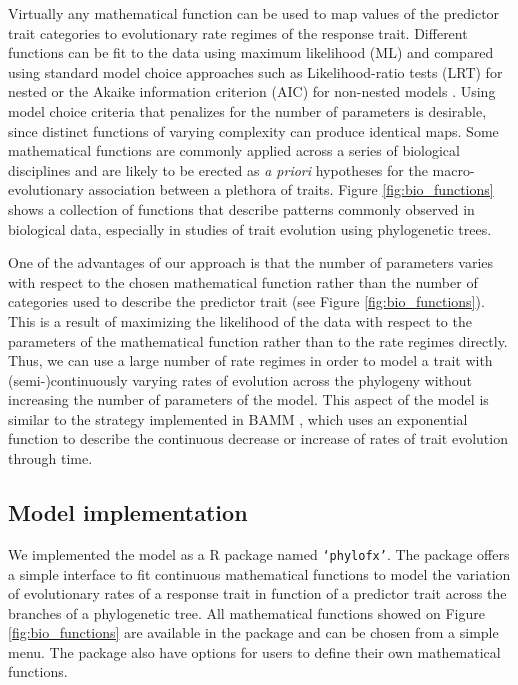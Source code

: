Virtually any mathematical function can be used to map values of the predictor trait categories to evolutionary rate regimes of the response trait. Different functions can be fit to the data using maximum likelihood (ML) and compared using standard model choice approaches such as Likelihood-ratio tests (LRT) for nested or the Akaike information criterion (AIC) for non-nested models \citep{burnham_model_2003}. Using model choice criteria that penalizes for the number of parameters \citep[such as AIC --][]{burnham_model_2003} is desirable, since distinct functions of varying complexity can produce identical maps. Some mathematical functions are commonly applied across a series of biological disciplines and are likely to be erected as \textit{a priori} hypotheses for the macro-evolutionary association between a plethora of traits. Figure \ref{fig:bio_functions} shows a collection of functions that describe patterns commonly observed in biological data, especially in studies of trait evolution using phylogenetic trees.

One of the advantages of our approach is that the number of parameters varies with respect to the chosen mathematical function rather than the number of categories used to describe the predictor trait (see Figure \ref{fig:bio_functions}). This is a result of maximizing the likelihood of the data with respect to the parameters of the mathematical function rather than to the rate regimes directly. Thus, we can use a large number of rate regimes in order to model a trait with  (semi-)continuously varying rates of evolution across the phylogeny without increasing the number of parameters of the model. This aspect of the model is similar to the strategy implemented in BAMM \citep{rabosky_2014}, which uses an exponential function to describe the continuous decrease or increase of rates of trait evolution through time.

\subsection{Model implementation}

We implemented the model as a R package named \texttt{`phylofx'}. The package offers a simple interface to fit continuous mathematical functions to model the variation of evolutionary rates of a response trait in function of a predictor trait across the branches of a phylogenetic tree. All mathematical functions showed on Figure \ref{fig:bio_functions} are available in the package and can be chosen from a simple menu. The package also have options for users to define their own mathematical functions.

